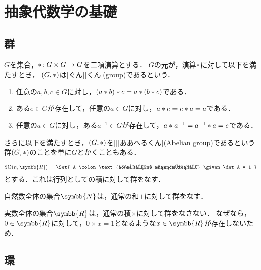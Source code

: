 \documentclass[../sotsu.tex]{subfiles}
\begin{document}
\section{抽象代数学の基礎}

\subsection{群}

\begin{definition}[群]
    \label{dfn:group}
    $G$を集合，$\mathbin{\ast} \colon G \times G \to G$を二項演算とする．
    $G$の元が，演算$\mathbin{\ast}$に対して以下を満たすとき，
    $(G, \mathbin{\ast})$は[ぐん][くん](group)であるという．
    \begin{enumerate}
        \item 任意の$a, b, c \in G$に対し，$(a \mathbin{\ast} b) \mathbin{\ast} c = a \mathbin{\ast} (b \mathbin{\ast} c)$である．
        \item ある$e \in G$が存在して，任意の$a \in G$に対し，$a \mathbin{\ast} e = e \mathbin{\ast} a = a$である．
        \item 任意の$a \in G$に対し，ある$a^{-1} \in G$が存在して，$a \mathbin{\ast} a^{-1} = a^{-1} \mathbin{\ast} a = e$である．
    \end{enumerate}
    さらに以下を満たすとき，$(G, \mathbin{\ast})$を[][ああへるくん](Abelian group)であるという
    群$(G, \mathbin{\ast})$のことを単に$G$とかくこともある．
\end{definition}

\begin{example}
    \begin{equation*}
        \mathrm{SO}(n, \symbb{R}) \coloneq \Set{ A \colon \text{実成分$n$-次正方行列} \given \det A = 1 }
    \end{equation*}
    とする．これは行列としての積に対して群をなす．
\end{example}

\begin{example}
    自然数全体の集合$\symbb{N}$は，通常の和$+$に対して群をなす．
\end{example}

\begin{example}
    実数全体の集合$\symbb{R}$は，通常の積$\times$に対して群をなさない．
    なぜなら，$0 \in \symbb{R}$に対して，$0 \times x = 1$となるような$x \in \symbb{R}$が存在しないため．
\end{example}


\subsection{環}
\end{document}
